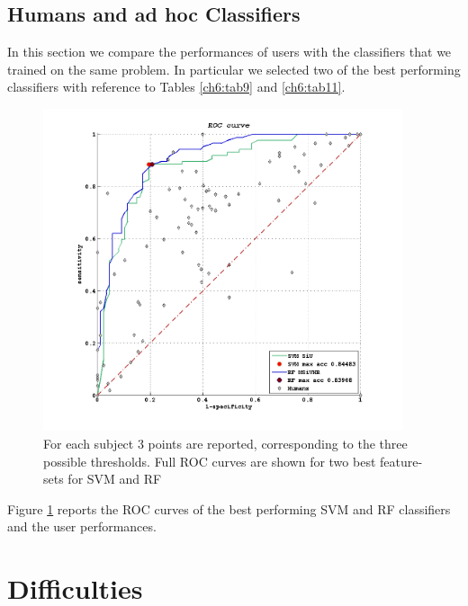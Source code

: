 \vspace{0.5cm}

\subsection{Humans and ad hoc Classifiers}

In this section we compare the performances of users with the classifiers that we trained on the same problem. In particular we selected two of the best performing classifiers with 
reference to Tables \ref{ch6:tab9} and \ref{ch6:tab11}.

\begin{figure}[!htb]
   \begin{center}
    \includegraphics[width=0.94\textwidth]{./images/human/class_humans.png}
    \caption[ROC plot humans vs. classifiers]{For each subject 3 points are reported, corresponding to the three possible thresholds.
    Full ROC curves are shown for two best feature-sets for SVM and RF}
    \label{ch6:fig23}
    \end{center}
\end{figure}

Figure \ref{ch6:fig23} reports the \Gls{ROC} curves of the best performing \Gls{SVM} and \Gls{RF} classifiers and the user performances.

\vspace{0.5cm}

\section{Difficulties}

